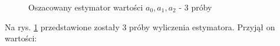 \documentclass[12pt]{article}
\begin{document}
\begin{figure}[H]
    \centering
    \quad
    
    \caption{Oszacowany estymator wartości $a_0, a_1, a_2$ - 3 próby}
    \label{identyfikacja_estymator}
\end{figure}
Na rys. \ref{identyfikacja_estymator} przedstawione zostały 3 próby wyliczenia estymatora. Przyjął on wartości:
\end{document}
